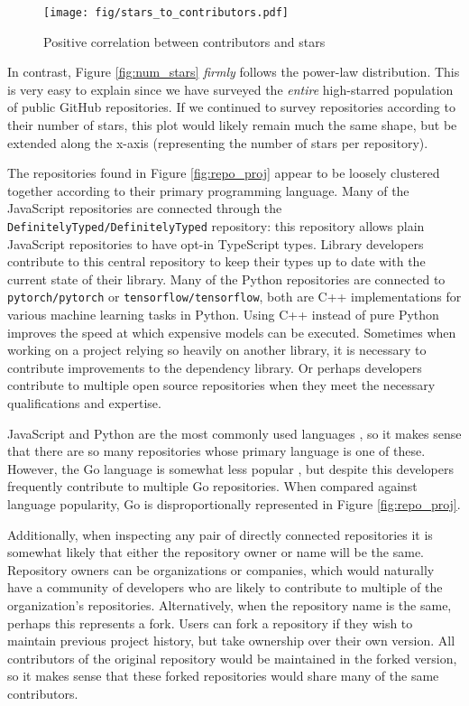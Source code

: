 \documentclass[11pt]{article}
\begin{document}
\begin{figure}[H]
  \centering
  \texttt{[image: fig/stars\_to\_contributors.pdf]}
  \caption{Positive correlation between contributors and stars}
  \label{fig:stars_to_contributors}
\end{figure}

In contrast, Figure \ref{fig:num_stars} \emph{firmly} follows the power-law distribution. This is very easy to explain since we have surveyed the \emph{entire} high-starred population of public GitHub repositories. If we continued to survey repositories according to their number of stars, this plot would likely remain much the same shape, but be extended along the x-axis (representing the number of stars per repository).

The repositories found in Figure \ref{fig:repo_proj} appear to be loosely clustered together according to their primary programming language. Many of the JavaScript repositories are connected through the \texttt{DefinitelyTyped/DefinitelyTyped} repository: this repository allows plain JavaScript repositories to have opt-in TypeScript types. Library developers contribute to this central repository to keep their types up to date with the current state of their library. Many of the Python repositories are connected to \texttt{pytorch/pytorch} or \texttt{tensorflow/tensorflow}, both are C++ implementations for various machine learning tasks in Python. Using C++ instead of pure Python improves the speed at which expensive models can be executed. Sometimes when working on a project relying so heavily on another library, it is necessary to contribute improvements to the dependency library. Or perhaps developers contribute to multiple open source repositories when they meet the necessary qualifications and expertise.

JavaScript and Python are the most commonly used languages \cite{jetbrains}, so it makes sense that there are so many repositories whose primary language is one of these. However, the Go language is somewhat less popular \cite{jetbrains}, but despite this developers frequently contribute to multiple Go repositories. When compared against language popularity, Go is disproportionally represented in Figure \ref{fig:repo_proj}.

Additionally, when inspecting any pair of directly connected repositories it is somewhat likely that either the repository owner or name will be the same. Repository owners can be organizations or companies, which would naturally have a community of developers who are likely to contribute to multiple of the organization's repositories. Alternatively, when the repository name is the same, perhaps this represents a fork. Users can fork a repository if they wish to maintain previous project history, but take ownership over their own version. All contributors of the original repository would be maintained in the forked version, so it makes sense that these forked repositories would share many of the same contributors.
\end{document}
